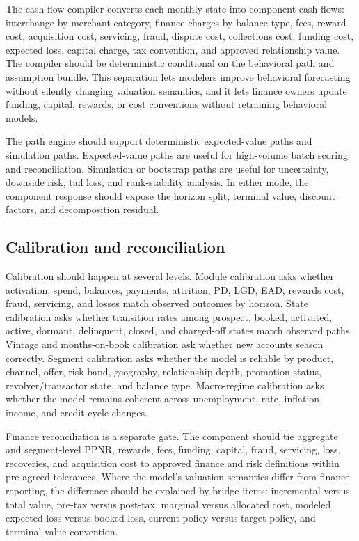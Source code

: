 \documentclass[11pt]{article}
\newcommand{\1}{\mathbf{1}}
\begin{document}
The cash-flow compiler converts each monthly state into component cash flows:
interchange by merchant category, finance charges by balance type, fees,
reward cost, acquisition cost, servicing, fraud, dispute cost, collections
cost, funding cost, expected loss, capital charge, tax convention, and
approved relationship value. The compiler should be deterministic conditional
on the behavioral path and assumption bundle. This separation lets modelers
improve behavioral forecasting without silently changing valuation semantics,
and it lets finance owners update funding, capital, rewards, or cost
conventions without retraining behavioral models.

The path engine should support deterministic expected-value paths and
simulation paths. Expected-value paths are useful for high-volume batch
scoring and reconciliation. Simulation or bootstrap paths are useful for
uncertainty, downside risk, tail loss, and rank-stability analysis. In either
mode, the component response should expose the horizon split, terminal value,
discount factors, and decomposition residual.

\subsection{Calibration and reconciliation}
\label{subsec:calibration-reconciliation}

Calibration should happen at several levels. Module calibration asks whether
activation, spend, balances, payments, attrition, PD, LGD, EAD, rewards cost,
fraud, servicing, and losses match observed outcomes by horizon. State
calibration asks whether transition rates among prospect, booked, activated,
active, dormant, delinquent, closed, and charged-off states match observed
paths. Vintage and months-on-book calibration ask whether new accounts season
correctly. Segment calibration asks whether the model is reliable by product,
channel, offer, risk band, geography, relationship depth, promotion status,
revolver/transactor state, and balance type. Macro-regime calibration asks
whether the model remains coherent across unemployment, rate, inflation,
income, and credit-cycle changes.

Finance reconciliation is a separate gate. The component should tie aggregate
and segment-level PPNR, rewards, fees, funding, capital, fraud, servicing,
loss, recoveries, and acquisition cost to approved finance and risk definitions
within pre-agreed tolerances. Where the model's valuation semantics differ
from finance reporting, the difference should be explained by bridge items:
incremental versus total value, pre-tax versus post-tax, marginal versus
allocated cost, modeled expected loss versus booked loss, current-policy versus
target-policy, and terminal-value convention.
\end{document}
